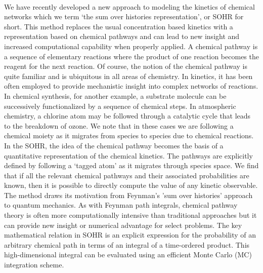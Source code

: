 \paragraph{}
We have recently developed a new approach to modeling the kinetics of chemical
networks which we term ‘the sum over histories representation’, or SOHR for short.\cite{ch1_IRPC_15_kramer2014following,ch1_IRPC_16_ch3_6_ch4_8_bai2014sum,ch1_IRPC_17_ch4_9_bai2015sum,ch1_IRPC_18_bai2017simulating} This method replaces the usual concentration based kinetics with a representation
based on chemical pathways and can lead to new insight and increased computational
capability when properly applied. A chemical pathway is a sequence of
elementary reactions where the product of one reaction becomes the reagent for the
next reaction. Of course, the notion of the chemical pathway is quite familiar and is
ubiquitous in all areas of chemistry. In kinetics, it has been often employed to provide
mechanistic insight into complex networks of reactions.\cite{ch1_IRPC_19_he2008graph,ch1_IRPC_20_lehmann2004algorithm,ch1_IRPC_21_feng2010dominant,ch1_IRPC_22_chern1990effective} In chemical synthesis,
for another example, a substrate molecule can be successively functionalized by a
sequence of chemical steps. In atmospheric chemistry, a chlorine atom may be followed
through a catalytic cycle that leads to the breakdown of ozone. We note that in these
cases we are following a chemical moiety as it migrates from species to species due to
chemical reactions. In the SOHR, the idea of the chemical pathway becomes the basis of a quantitative
representation of the chemical kinetics. The pathways are explicitly defined by
following a ‘tagged atom’ as it migrates through species space. We find that if all the
relevant chemical pathways and their associated probabilities are known, then it is possible
to directly compute the value of any kinetic observable. The method draws its
motivation from Feynman's 'sum over histories' approach to quantum mechanics.\cite{ch4_26_feynman2010quantum}
As with Feynman path integrals, chemical pathway theory is often more computationally
intensive than traditional approaches but it can provide new insight or numerical
advantage for select problems.\cite{ch1_IRPC_24_makri1999time,ch1_IRPC_25_cao1994formulation,ch1_IRPC_26_berne1986simulation} The key mathematical relation in SOHR is an explicit expression for the probability of an arbitrary chemical path in terms of an
integral of a time-ordered product. This high-dimensional integral can be evaluated
using an efficient Monte Carlo (MC) integration scheme.
\newline

